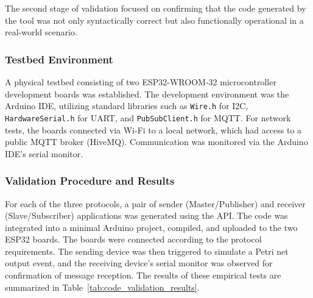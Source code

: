   The second stage of validation focused on confirming that the code generated by the tool was not only syntactically correct but also functionally operational in a real-world scenario.

\subsubsection{Testbed Environment}
  A physical testbed consisting of two ESP32-WROOM-32 microcontroller development boards was established. The development environment was the Arduino IDE, utilizing standard libraries such as \texttt{Wire.h} for I2C, \texttt{HardwareSerial.h} for UART, and \texttt{PubSubClient.h} for MQTT. For network tests, the boards connected via Wi-Fi to a local network, which had access to a public MQTT broker (HiveMQ). Communication was monitored via the Arduino IDE's serial monitor.

\subsubsection{Validation Procedure and Results}
For each of the three protocols, a pair of sender (Master/Publisher) and receiver (Slave/Subscriber) applications was generated using the API.   The code was integrated into a minimal Arduino project, compiled, and uploaded to the two ESP32 boards.   The boards were connected according to the protocol requirements.   The sending device was then triggered to simulate a Petri net output event, and the receiving device's serial monitor was observed for confirmation of message reception. The results of these empirical tests are summarized in Table~\ref{tab:code_validation_results}.

